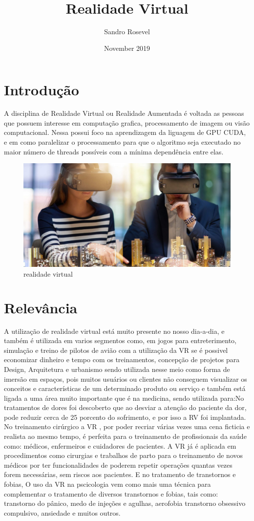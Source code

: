 \documentclass{paper}
\title{Realidade Virtual}
\author{Sandro Rosevel}
\date{November 2019}
\begin{document}
\section{Introdução}
A disciplina de Realidade Virtual ou Realidade Aumentada é voltada as pessoas que possuem interesse em computação grafica, processamento de imagem ou visão computacional.
Nessa possui foco na aprendizagem da liguagem de GPU CUDA, e em como paralelizar o processamento para que o algoritmo seja executado no maior número de threads possíveis com a mínima dependência entre elas.
\begin{figure}[h!]
\centering
\includegraphics[scale=0.2]{realidade-virtual.jpg}
\caption{realidade virtual}
\label{fig:realidade virtual}
\end{figure}
\section{Relevância}
A utilização de realidade virtual está muito presente no nosso dia-a-dia, e também é utilizada em varios segmentos como, em jogos para entreterimento, simulação e treino de pilotos de avião com a utilização da VR se é possivel economizar dinheiro e tempo com os treinamentos, concepção de projetos para Design, Arquitetura e urbanismo sendo utilizada nesse meio como forma de imersão em espaços, pois muitos usuários ou clientes não conseguem visualizar os conceitos e características de um determinado produto ou serviço\citep{arq2019} e também está ligada a uma área muito importante que é na medicina, sendo utilizada para:No tratamentos de dores  foi descoberto que ao desviar a atenção do paciente da dor, pode reduzir cerca de 25 porcento do sofrimento, e por isso a RV foi implantada. No treinamento cirúrgico a VR , por poder recriar várias vezes uma cena ficticia e realista ao mesmo tempo, é perfeita para o treinamento de profissionais da saúde como: médicos, enfermeiros e cuidadores de pacientes. A VR já é aplicada em procedimentos como cirurgias e trabalhos de parto para o treinamento de novos médicos por ter funcionalidades de poderem repetir operações quantas vezes forem necessárias, sem riscos aos pacientes. E no tratamento de transtornos e fobias, O uso da VR na pscicologia vem como mais uma técnica para complementar o tratamento de diversos transtornos e fobias, tais como: transtorno do pânico, medo de injeções e agulhas, aerofobia transtorno obsessivo compulsivo, ansiedade e muitos outros.\citep{med2019} \citep{fob2019}
\end{document}
